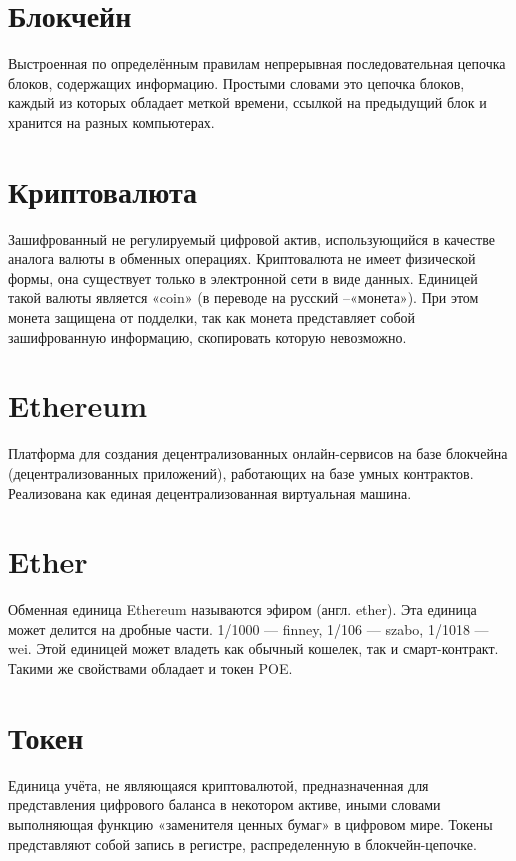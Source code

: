 \documentclass[a4paper,12pt]{report}
\begin{document}
\section{Блокчейн}
Выстроенная по определённым правилам непрерывная последовательная цепочка блоков, содержащих информацию. Простыми словами это цепочка блоков, каждый из которых обладает меткой времени, ссылкой на предыдущий блок и хранится на разных компьютерах.

\section{Криптовалюта}
Зашифрованный не регулируемый цифровой актив, использующийся в качестве аналога валюты в обменных операциях. Криптовалюта не имеет физической формы, она существует только в электронной сети в виде данных. Единицей такой валюты является «coin» (в переводе на русский –«монета»). При этом монета защищена от подделки, так как монета представляет собой зашифрованную информацию, скопировать которую невозможно.

\section{Ethereum}
Платформа для создания децентрализованных онлайн-сервисов на базе блокчейна (децентрализованных приложений), работающих на базе умных контрактов. Реализована как единая децентрализованная виртуальная машина.

\section{Ether}
Обменная единица Ethereum называются эфиром (англ. ether). Эта единица может делится на дробные части. 1/1000 — finney, 1/106 — szabo, 1/1018 — wei. Этой единицей может владеть как обычный кошелек, так и смарт-контракт. Такими же свойствами обладает и токен POE.

\section{Токен}
Единица учёта, не являющаяся криптовалютой, предназначенная для представления цифрового баланса в некотором активе, иными словами выполняющая функцию «заменителя ценных бумаг» в цифровом мире. Токены представляют собой запись в регистре, распределенную в блокчейн-цепочке.
\end{document}
